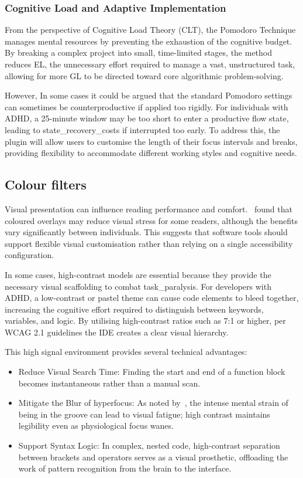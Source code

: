 \subsubsection{Cognitive Load and Adaptive Implementation}
From the perspective of Cognitive Load Theory (CLT), the Pomodoro Technique manages mental resources by preventing the exhaustion of the cognitive budget. By breaking a 
complex project into small, time-limited stages, the method reduces \gls{EL}, the unnecessary effort required to manage a vast, unstructured task, allowing for more 
\gls{GL} to be directed toward core algorithmic problem-solving.

However, In some cases it could be argued that the standard Pomodoro settings can sometimes be counterproductive if applied too rigidly. For individuals with \gls{ADHD}, 
a 25-minute window may be too short to enter a productive flow state, leading to \glspl{state_recovery_cost} if interrupted too early. To address this, the plugin
 will allow users to customise the length of their focus intervals and breaks, providing flexibility to accommodate different working styles and cognitive needs.

\subsection{Colour filters}
Visual presentation can influence reading performance and comfort.~\textcite{griffiths2016effect} found that coloured overlays may reduce visual stress for some readers, 
although the benefits vary significantly between individuals. This suggests that software tools should support flexible visual customisation rather than relying on a single accessibility configuration.

In some cases, high-contrast models are essential because they provide the necessary visual \gls{scaffolding} to combat \gls{task_paralysis}. For developers with \gls{ADHD}, a low-contrast or pastel theme can
cause code elements to bleed together, increasing the cognitive effort required to distinguish between keywords, variables, and logic.
By utilising high-contrast ratios such as 7:1 or higher, per \gls{WCAG} 2.1 guidelines the \gls{IDE} creates a clear visual hierarchy.

This high signal environment provides several technical advantages:
\begin{itemize}
    \item Reduce Visual Search Time: Finding the start and end of a function block becomes instantaneous rather than a manual scan.
    \item Mitigate the Blur of \Gls{hyperfocus}: As noted by~\cite{newman2025get}, the intense mental strain of being in the groove can lead to visual fatigue; high contrast maintains legibility even as physiological focus wanes.
    \item Support Syntax Logic: In complex, nested code, high-contrast separation between brackets and operators serves as a visual prosthetic, offloading the work of pattern recognition from the brain to the interface.
\end{itemize}

